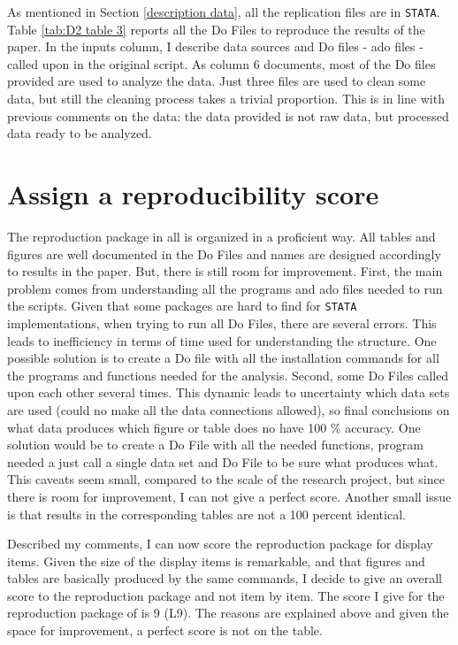 \documentclass{article}
\begin{document}
As mentioned in Section \ref{description data}, all the replication files are in \texttt{STATA}. Table \ref{tab:D2 table 3} reports all the Do Files to reproduce the results of the paper. In the inputs column, I describe data sources and Do files - ado files - called upon in the original script. As column 6 documents, most of the Do files provided are used to analyze the data. Just three files are used to clean some data, but still the cleaning process takes a trivial proportion. This is in line with previous comments on the data: the data provided is not raw data, but processed data ready to be analyzed.

\section{Assign a reproducibility score}

The reproduction package in all is organized in a proficient way. All tables and figures are well documented in the Do Files and names are designed accordingly to results in the paper. But, there is still room for improvement. First, the main problem comes from understanding all the programs and ado files needed to run the scripts. Given that some packages are hard to find for \texttt{STATA} implementations, when trying to run all Do Files, there are several errors. This leads to inefficiency in terms of time used for understanding the structure. One possible solution is to create a Do file with all the installation commands for all the programs and functions needed for the analysis. Second, some Do Files called upon each other several times. This dynamic leads to uncertainty which data sets are used (could no make all the data connections allowed), so final conclusions on what data produces which figure or table does no have 100 \% accuracy. One solution would be to create a Do File with all the needed functions, program needed a just call a single data set and Do File to be sure what produces what. This caveats seem small, compared to the scale of the research project, but since there is room for improvement, I can not give a perfect score. Another small issue is that results in the corresponding tables are not a 100 percent identical.

\medskip

Described my comments, I can now score the reproduction package for display items. Given the size of the display items is remarkable, and that figures and tables are basically produced by the same commands, I decide to give an overall score to the reproduction package and not item by item. The score I give for the reproduction package of \cite{abebe2021anonymity} is 9 (L9). The reasons are explained above and given the space for improvement, a perfect score is not on the table.
\end{document}
